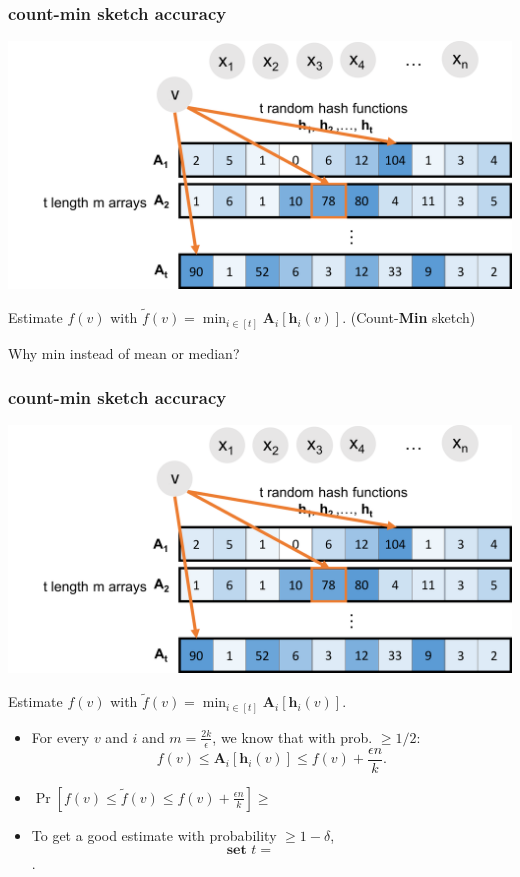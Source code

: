 \documentclass[]{beamer}
\newcommand{\bv}[1]{\mathbf{#1}}
\begin{document}
	\begin{frame}
		\frametitle{count-min sketch accuracy}
		\begin{center}
			\hspace{-2em}
			\includegraphics[width=.85\textwidth]{cmm5.png}
		\end{center}
		Estimate $f(v)$ with $\tilde{f}(v) = \min_{i \in [t]} \bv{A}_i[\bv{h}_i(v)]$. (Count-\alert{\textbf{Min}} sketch)
		\begin{center}
			Why min instead of mean or median?
		\end{center}
	\end{frame}
	
	
	\begin{frame}
		\frametitle{count-min sketch accuracy}
		\small
		\begin{center}
			\hspace{-2em}
			\includegraphics[width=.65\textwidth]{cmm5.png}
		\end{center}
		Estimate $f(v)$ with $\tilde{f}(v) = \min_{i \in [t]} \bv{A}_i[\bv{h}_i(v)]$.
		\begin{itemize}
			\item For every $v$ and $i$ and $m = \frac{2k}{\epsilon}$, we know that with prob. $\ge 1/2$:
			\vspace{-.5em}
			$$f(v) \le \bv{A}_i[\bv{h}_i(v)] \le f(v) + \frac{\epsilon n}{k}.$$
			\item \alert{\textbf{$\Pr [f(v) \le \tilde{f}(v) \le f(v) + \frac{\epsilon n}{k}] \geq$}}
			\item To get a good estimate with probability $\ge 1-\delta$, 
			$$\textbf{set } t = \hspace{3em}$$.
		\end{itemize}
	\end{frame}
	
\end{document}

